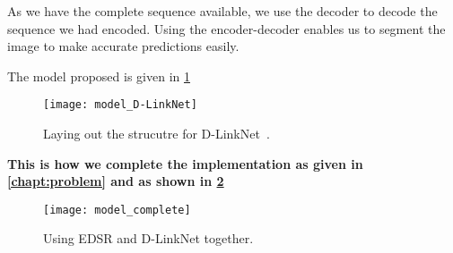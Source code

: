 As we have the complete sequence available, we use the decoder to decode the sequence we had encoded. Using the encoder-decoder enables us to segment the image to make accurate predictions easily.

The model proposed is given in \cref{fig:model_D-LinkNet}
\begin{figure}[h!]
  \centering
  \texttt{[image: model\_D-LinkNet]}
  \caption[Laying out the strucutre for D-LinkNet]{Laying out the strucutre for D-LinkNet~\cite{D-LinkNet}.}
  \label{fig:model_D-LinkNet}
\end{figure}


\textbf{This is how we complete the implementation as given in \cref{chapt:problem} and as shown in \cref{fig:model_complete}}

\begin{figure}[h!]
  \centering
  \texttt{[image: model\_complete]}
  \caption{Using EDSR and D-LinkNet together.}
  \label{fig:model_complete}
\end{figure}